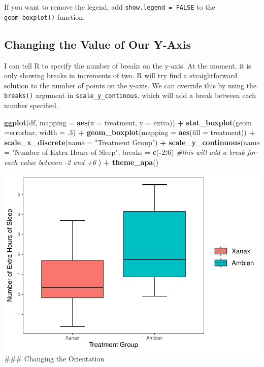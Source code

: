 \documentclass[
]{book}
\newenvironment{Shaded}{\begin{snugshade}}{\end{snugshade}}
\newcommand{\AttributeTok}[1]{\textcolor[rgb]{0.13,0.29,0.53}{#1}}
\newcommand{\CommentTok}[1]{\textcolor[rgb]{0.56,0.35,0.01}{\textit{#1}}}
\newcommand{\DecValTok}[1]{\textcolor[rgb]{0.00,0.00,0.81}{#1}}
\newcommand{\FunctionTok}[1]{\textcolor[rgb]{0.13,0.29,0.53}{\textbf{#1}}}
\newcommand{\NormalTok}[1]{#1}
\newcommand{\SpecialCharTok}[1]{\textcolor[rgb]{0.81,0.36,0.00}{\textbf{#1}}}
\newcommand{\StringTok}[1]{\textcolor[rgb]{0.31,0.60,0.02}{#1}}
\begin{document}
If you want to remove the legend, add \texttt{show.legend\ =\ FALSE} to the \texttt{geom\_boxplot()} function.

\hypertarget{changing-the-value-of-our-y-axis}{%
\subsection{Changing the Value of Our Y-Axis}\label{changing-the-value-of-our-y-axis}}

I can tell R to specify the number of breaks on the y-axis. At the moment, it is only showing breaks in increments of two. R will try find a straightforward solution to the number of points on the y-axis. We can override this by using the \texttt{breaks()} argument in \texttt{scale\_y\_continous}, which will add a break between each number specified.

\begin{Shaded}
\begin{Highlighting}[]
\FunctionTok{ggplot}\NormalTok{(df, }\AttributeTok{mapping =} \FunctionTok{aes}\NormalTok{(}\AttributeTok{x =}\NormalTok{ treatment, }\AttributeTok{y =}\NormalTok{ extra)) }\SpecialCharTok{+} 
  \FunctionTok{stat\_boxplot}\NormalTok{(}\AttributeTok{geom =}\StringTok{\textquotesingle{}errorbar\textquotesingle{}}\NormalTok{, }\AttributeTok{width =}\NormalTok{ .}\DecValTok{3}\NormalTok{) }\SpecialCharTok{+}
  \FunctionTok{geom\_boxplot}\NormalTok{(}\AttributeTok{mapping =} \FunctionTok{aes}\NormalTok{(}\AttributeTok{fill =}\NormalTok{ treatment)) }\SpecialCharTok{+} 
  \FunctionTok{scale\_x\_discrete}\NormalTok{(}\AttributeTok{name =} \StringTok{"Treatment Group"}\NormalTok{) }\SpecialCharTok{+} 
  \FunctionTok{scale\_y\_continuous}\NormalTok{(}\AttributeTok{name =} \StringTok{"Number of Extra Hours of Sleep"}\NormalTok{, }
                     \AttributeTok{breaks =} \FunctionTok{c}\NormalTok{(}\SpecialCharTok{{-}}\DecValTok{2}\SpecialCharTok{:}\DecValTok{6}\NormalTok{) }\CommentTok{\#this will add a break for each value between {-}2 and +6}
\NormalTok{                     ) }\SpecialCharTok{+}
  \FunctionTok{theme\_apa}\NormalTok{()}
\end{Highlighting}
\end{Shaded}

\includegraphics{rintro_demo_files/figure-latex/unnamed-chunk-297-1.pdf}
\#\#\# Changing the Orientation
\end{document}
